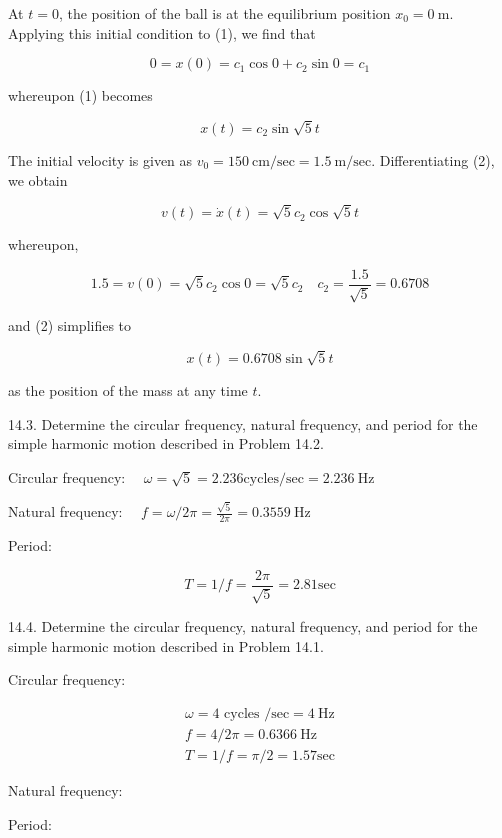 \documentclass[10pt]{article}
\begin{document}
At $t=0$, the position of the ball is at the equilibrium position $x_{0}=0 \mathrm{~m}$. Applying this initial condition to (1), we find that

$$
0=x(0)=c_{1} \cos 0+c_{2} \sin 0=c_{1}
$$

whereupon (1) becomes


\begin{equation*}
x(t)=c_{2} \sin \sqrt{5} t \tag{2}
\end{equation*}


The initial velocity is given as $v_{0}=150 \mathrm{~cm} / \mathrm{sec}=1.5 \mathrm{~m} / \mathrm{sec}$. Differentiating (2), we obtain

$$
v(t)=\dot{x}(t)=\sqrt{5} c_{2} \cos \sqrt{5} t
$$

whereupon,

$$
1.5=v(0)=\sqrt{5} c_{2} \cos 0=\sqrt{5} c_{2} \quad c_{2}=\frac{1.5}{\sqrt{5}}=0.6708
$$

and (2) simplifies to


\begin{equation*}
x(t)=0.6708 \sin \sqrt{5} t \tag{3}
\end{equation*}


as the position of the mass at any time $t$.

14.3. Determine the circular frequency, natural frequency, and period for the simple harmonic motion described in Problem 14.2.

Circular frequency: $\quad \omega=\sqrt{5}=2.236 \mathrm{cycles} / \mathrm{sec}=2.236 \mathrm{~Hz}$

Natural frequency: $\quad f=\omega / 2 \pi=\frac{\sqrt{5}}{2 \pi}=0.3559 \mathrm{~Hz}$

Period:

$$
T=1 / f=\frac{2 \pi}{\sqrt{5}}=2.81 \mathrm{sec}
$$

14.4. Determine the circular frequency, natural frequency, and period for the simple harmonic motion described in Problem 14.1.

Circular frequency:

$$
\begin{gathered}
\omega=4 \text { cycles } / \mathrm{sec}=4 \mathrm{~Hz} \\
f=4 / 2 \pi=0.6366 \mathrm{~Hz} \\
T=1 / f=\pi / 2=1.57 \mathrm{sec}
\end{gathered}
$$

Natural frequency:

Period:
\end{document}

